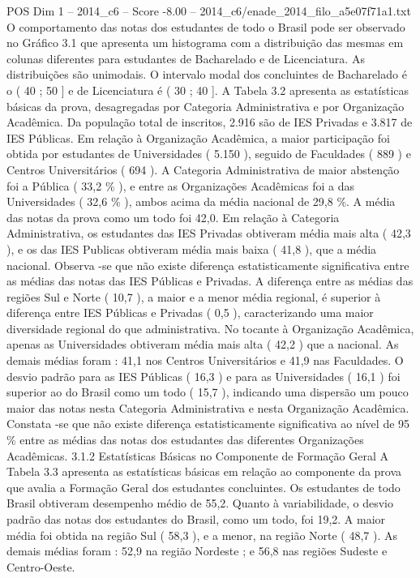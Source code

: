 \begin{textsample}{POS Dim 1 – 2014\_c6 – Score -8.00 – 2014\_c6/enade\_2014\_filo\_a5e07f71a1.txt}
O comportamento das notas dos estudantes de todo o Brasil pode ser observado no Gráfico 3.1 que apresenta um histograma com a distribuição das mesmas em colunas diferentes para estudantes de Bacharelado e de Licenciatura.
As distribuições são unimodais.
O intervalo modal dos concluintes de Bacharelado é o ( 40 ; 50 ] e de Licenciatura é ( 30 ; 40 ].
A Tabela 3.2 apresenta as estatísticas básicas da prova, desagregadas por Categoria Administrativa e por Organização Acadêmica.
Da população total de inscritos, 2.916 são de IES Privadas e 3.817 de IES Públicas.
Em relação à Organização Acadêmica, a maior participação foi obtida por estudantes de Universidades ( 5.150 ), seguido de Faculdades ( 889 ) e Centros Universitários ( 694 ).
A Categoria Administrativa de maior abstenção foi a Pública ( 33,2 \% ), e entre as Organizações Acadêmicas foi a das Universidades ( 32,6 \% ), ambos acima da média nacional de 29,8 \%.
A média das notas da prova como um todo foi 42,0.
Em relação à Categoria Administrativa, os estudantes das IES Privadas obtiveram média mais alta ( 42,3 ), e os das IES Publicas obtiveram média mais baixa ( 41,8 ), que a média nacional.
Observa -se que não existe diferença estatisticamente significativa entre as médias das notas das IES Públicas e Privadas.
A diferença entre as médias das regiões Sul e Norte ( 10,7 ), a maior e a menor média regional, é superior à diferença entre IES Públicas e Privadas ( 0,5 ), caracterizando uma maior diversidade regional do que administrativa.
No tocante à Organização Acadêmica, apenas as Universidades obtiveram média mais alta ( 42,2 ) que a nacional.
As demais médias foram : 41,1 nos Centros Universitários e 41,9 nas Faculdades.
O desvio padrão para as IES Públicas ( 16,3 ) e para as Universidades ( 16,1 ) foi superior ao do Brasil como um todo ( 15,7 ), indicando uma dispersão um pouco maior das notas nesta Categoria Administrativa e nesta Organização Acadêmica.
Constata -se que não existe diferença estatisticamente significativa ao nível de 95 \% entre as médias das notas dos estudantes das diferentes Organizações Acadêmicas. 3.1.2 Estatísticas Básicas no Componente de Formação Geral A Tabela 3.3 apresenta as estatísticas básicas em relação ao componente da prova que avalia a Formação Geral dos estudantes concluintes.
Os estudantes de todo Brasil obtiveram desempenho médio de 55,2.
Quanto à variabilidade, o desvio padrão das notas dos estudantes do Brasil, como um todo, foi 19,2.
A maior média foi obtida na região Sul ( 58,3 ), e a menor, na região Norte ( 48,7 ).
As demais médias foram : 52,9 na região Nordeste ; e 56,8 nas regiões Sudeste e Centro-Oeste.

\end{textsample}
